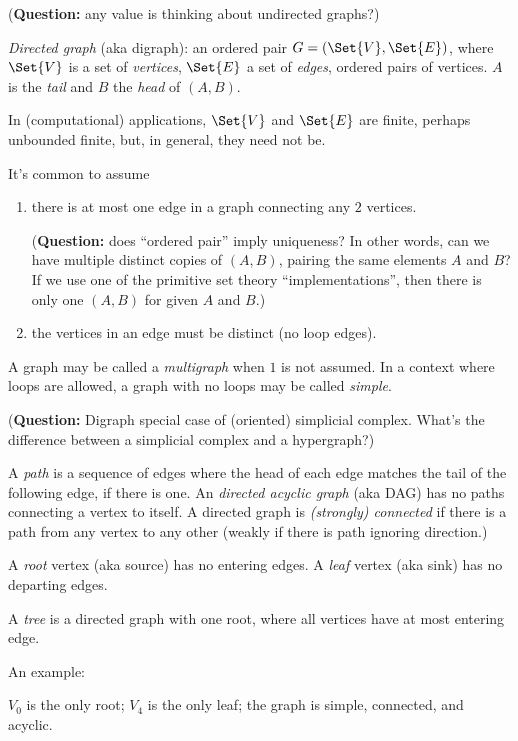 \documentclass[11pt,openany]{article}
\begin{document}
(\textbf{Question:} any value is thinking about undirected graphs?)

\textit{Directed graph} (aka digraph): 
an ordered pair $G=\left( \Set{V}, \Set{E} \right)$,
where $\Set{V}$ is a set of \textit{vertices}, 
$\Set{E}$ a set of \textit{edges}, ordered pairs of vertices.
$A$ is the \textit{tail} and $B$ the \textit{head}
of $\left(A,B\right)$.

In (computational) applications, $\Set{V}$ and $\Set{E}$ 
are finite, perhaps unbounded finite,
but, in general, they need not be.

It's common to assume 
\begin{enumerate}
\item there is at most one edge
in a graph connecting any $2$ vertices.\par
(\textbf{Question:} does ``ordered pair'' imply uniqueness?
In other words, can we have multiple distinct copies of
 $\left(A,B\right)$, pairing the same elements $A$ and $B$?
 If we use one of the primitive set theory ``implementations'',
 then there is only one $\left(A,B\right)$ 
 for given $A$ and $B$.)
\item the vertices in an edge must be 
distinct (no loop edges).
\end{enumerate}

A graph may be called a \textit{multigraph} when $1$ is
not assumed.
In a context where loops are allowed,
a graph with no loops may be called \textit{simple}.

(\textbf{Question:} 
Digraph special case of (oriented) simplicial complex.
What's the difference between a simplicial complex 
and a hypergraph?)

A \textit{path} is a sequence of edges where the head of each
edge matches the tail of the following edge, if there is one.
An \textit{directed acyclic graph} (aka DAG) has no paths
connecting a vertex to itself.
A directed graph is \textit{(strongly) connected} if there is a path
from any vertex to any other (weakly if there is path
ignoring direction.)

A \textit{root} vertex (aka source) has no entering edges.
A \textit{leaf} vertex (aka sink) has no departing edges.

A \textit{tree} is a directed graph with one root, 
where all vertices have at most entering edge.

An example:
\begin{center}
\end{center}
$V_0$ is the only root; $V_4$ is the only leaf;
the graph is simple, connected, and acyclic.
\end{document}
